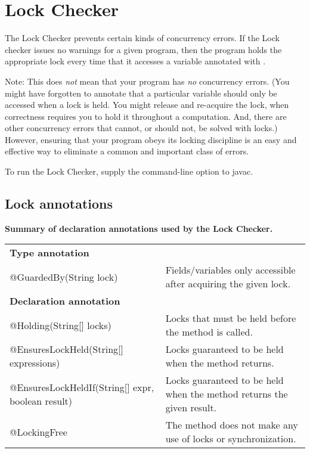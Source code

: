 \htmlhr
\chapter{Lock Checker\label{lock-checker}}

The Lock Checker prevents certain kinds of concurrency errors.  If the Lock
checker issues no warnings for a given program, then the program holds the
appropriate lock every time that it accesses a variable annotated with
.

Note:  This does \emph{not} mean that your program has \emph{no} concurrency
errors.  (You might have forgotten to annotate that a particular variable
should only be accessed when a lock is held.  You might release and
re-acquire the lock, when correctness requires you to hold it throughout a
computation.  And, there are other concurrency errors that cannot, or
should not, be solved with locks.)  However, ensuring that your
program obeys its locking discipline is an easy and effective way to
eliminate a common and important class of errors.


To run the Lock Checker, supply the
command-line option to javac.


\section{Lock annotations\label{lock-annotations}}

\textbf{Summary of declaration annotations used by the Lock Checker.}\\

\begin{smaller}
\begin{tabular}{l|l}
\textbf{Type annotation} & \\
@GuardedBy(String lock) &
Fields/variables only accessible after acquiring the given lock.
\\
\textbf{Declaration annotation} \\
@Holding(String[] locks) &
Locks that must be held before the method is called.
\\
@EnsuresLockHeld(String[] expressions) &
Locks guaranteed to be held when the method returns.
\\
@EnsuresLockHeldIf(String[] expr, boolean result) &
Locks guaranteed to be held when the method returns the given result.
\\
@LockingFree &
The method does not make any use of locks or synchronization.
\\
\end{tabular}
\end{smaller}

